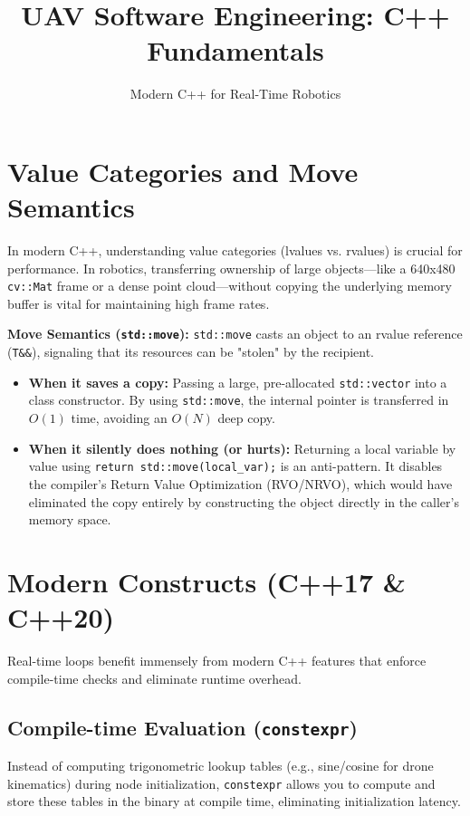 \documentclass{article}
\title{UAV Software Engineering: C++ Fundamentals}
\author{Modern C++ for Real-Time Robotics}
\date{}
\begin{document}
\maketitle

\section{Value Categories and Move Semantics}
In modern C++, understanding value categories (lvalues vs. rvalues) is crucial for performance. In robotics, transferring ownership of large objects---like a 640x480 \texttt{cv::Mat} frame or a dense point cloud---without copying the underlying memory buffer is vital for maintaining high frame rates.

\textbf{Move Semantics (\texttt{std::move}):} \texttt{std::move} casts an object to an rvalue reference (\texttt{T\&\&}), signaling that its resources can be "stolen" by the recipient.
\begin{itemize}
    \item \textbf{When it saves a copy:} Passing a large, pre-allocated \texttt{std::vector} into a class constructor. By using \texttt{std::move}, the internal pointer is transferred in $O(1)$ time, avoiding an $O(N)$ deep copy.
    \item \textbf{When it silently does nothing (or hurts):} Returning a local variable by value using \texttt{return std::move(local\_var);} is an anti-pattern. It disables the compiler's Return Value Optimization (RVO/NRVO), which would have eliminated the copy entirely by constructing the object directly in the caller's memory space.
\end{itemize}

\section{Modern Constructs (C++17 \& C++20)}
Real-time loops benefit immensely from modern C++ features that enforce compile-time checks and eliminate runtime overhead.

\subsection{Compile-time Evaluation (\texttt{constexpr})}
Instead of computing trigonometric lookup tables (e.g., sine/cosine for drone kinematics) during node initialization, \texttt{constexpr} allows you to compute and store these tables in the binary at compile time, eliminating initialization latency.
\end{document}
